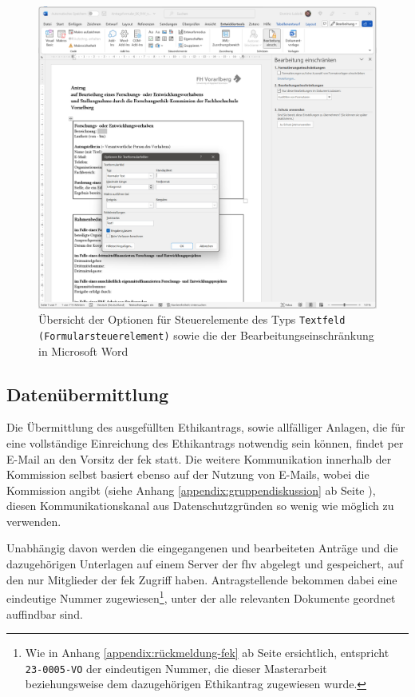 \documentclass[a4paper,12pt,twoside,numbers=noendperiod]{scrreprt}
\begin{document}
\begin{figure}[ht]
    \centering
    \includegraphics[width=\linewidth]{thesis/images/Luidold_Word-Vorlage-FHV-Textformularfeld.png}
    \caption{Übersicht der Optionen für Steuerelemente des Typs \texttt{Textfeld (Formularsteuerelement)} sowie die der Bearbeitungseinschränkung in Microsoft Word}
    \label{fig:optionen-textformularfeld-bearbeitungsmöglichkeiten}
\end{figure}

\subsection{Datenübermittlung}
\label{sub-sec:datenübermittlung}

Die Übermittlung des ausgefüllten Ethikantrags, sowie allfälliger Anlagen, die für eine vollständige Einreichung des Ethikantrags notwendig sein können, findet per E-Mail an den Vorsitz der \ac{fek} statt. \cite{fachhochschule_vorarlberg_gmbh_forschungsethik-kommission_2021} Die weitere Kommunikation innerhalb der Kommission selbst basiert ebenso auf der Nutzung von E-Mails, wobei die Kommission angibt (siehe Anhang \ref{appendix:gruppendiskussion} ab Seite \pageref{appendix:gruppendiskussion}), diesen Kommunikationskanal aus Datenschutzgründen so wenig wie möglich zu verwenden.

Unabhängig davon werden die eingegangenen und bearbeiteten Anträge und die dazugehörigen Unterlagen auf einem Server der \acl{fhv} abgelegt und gespeichert, auf den nur Mitglieder der \ac{fek} Zugriff haben. Antragstellende bekommen dabei eine eindeutige Nummer zugewiesen\footnote{Wie in Anhang \ref{appendix:rückmeldung-fek} ab Seite \pageref{appendix:rückmeldung-fek} ersichtlich, entspricht \texttt{23-0005-VO} der eindeutigen Nummer, die dieser Masterarbeit beziehungsweise dem dazugehörigen Ethikantrag zugewiesen wurde.}, unter der alle relevanten Dokumente geordnet auffindbar sind.
\end{document}
